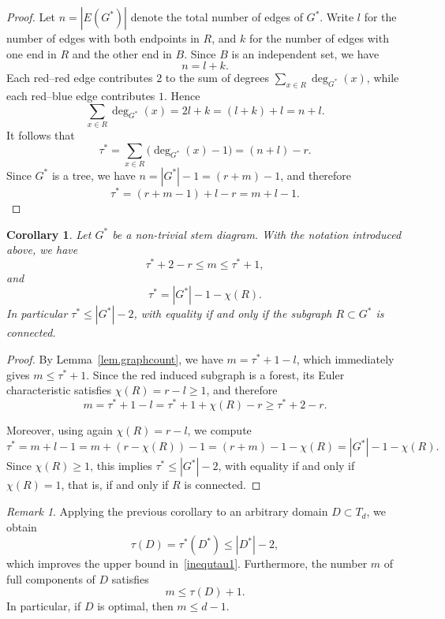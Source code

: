 \documentclass[a4paper, 11pt]{article}
\numberwithin{equation}{section}
\newtheorem{corollary}[theorem]{Corollary}
\theoremstyle{definition}
\theoremstyle{remark}
\newtheorem{remark}[theorem]{Remark}
\begin{document}
\begin{proof}
Let $n=|E(G^*)|$ denote the total number of edges of $G^*$. Write $l$ for the number of edges with both endpoints in $R$, and $k$ for the number of edges with one end in $R$ and the other end in $B$.
Since $B$ is an independent set, we have
\[
   n = l + k.
\]
Each red--red edge contributes $2$ to the sum of degrees
$\sum_{x\in R}\deg_{G^*}(x)$, while each red--blue edge contributes $1$.
Hence
\[
   \sum_{x\in R}\deg_{G^*}(x) = 2l + k = (l+k) + l  = n + l.
\]
It follows that
\[
   \tau^*  = \sum_{x\in R}\bigl(\deg_{G^*}(x)-1\bigr)
   = (n+l) - r.
\]
Since $G^*$ is a tree, we have $n=|G^*|-1=(r+m)-1$, and therefore
\[
 \tau^* = (r+m-1)+l-r = m+l-1.
\]
\end{proof}

\medskip

\begin{corollary}\label{cor.stem-bounds}
Let $G^*$ be a non-trivial stem diagram. With the notation introduced above, we have 
\[
   \tau^* +2 - r \le m \le \tau^* +1,
\]
and
\[
   \tau^* = |G^*| - 1 - \chi(R).
\]
In particular $\tau^* \le |G^*| - 2$, with equality if and only if the  subgraph $R \subset G^*$ is connected.
\end{corollary}

\begin{proof}
By Lemma~\ref{lem.graphcount}, we have $m=\tau^*+1-l$, which immediately gives $m\le \tau^* +1$.
Since the red induced subgraph is a forest, its Euler characteristic satisfies $\chi(R)=r-l\ge 1$, and therefore
\[
  m=\tau^*+1-l=\tau^*+1+\chi(R)-r\ge \tau^* +2-r.
\]

Moreover, using again $\chi(R)=r-l$, we compute
\[
  \tau^* = m+l-1 = m+(r-\chi(R))-1 = (r+m)-1-\chi(R)   = |G^*|-1-\chi(R).
\]
Since $\chi(R)\ge 1$, this implies $\tau^*\le |G^*|-2$, with equality  if and only if $\chi(R)=1$, that is, if and only if $R$ is connected.
\end{proof}

\medskip

\begin{remark} \label{rem.boundontaum}
Applying the previous corollary to an arbitrary domain $D \subset T_d$,  we obtain  
$$
 \tau(D)  = \tau^*(D^*)  \leq |D^*| -2,
$$
which improves the upper bound in~\eqref{inequtau1}.  
Furthermore, the number $m$ of full components of $D$ satisfies 
$$
 m \leq  \tau(D) +1.
$$ 
In particular, if $D$ is optimal, then $m \leq d-1$.

\end{remark}
\end{document}
